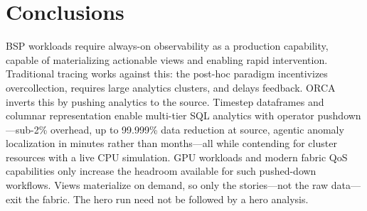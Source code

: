 
\section{Conclusions}






BSP workloads require always-on observability as a production capability, capable of materializing
actionable views and enabling rapid intervention.
Traditional tracing works against this: the post-hoc paradigm incentivizes overcollection, requires
large analytics clusters, and delays feedback.
ORCA inverts this by pushing analytics to the source.
Timestep dataframes and columnar representation enable multi-tier SQL analytics with operator
pushdown---sub-2\% overhead, up to 99.999\% data reduction at source, agentic anomaly localization
in minutes rather than months---all while contending for cluster resources with a live CPU
simulation.
GPU workloads and modern fabric QoS capabilities only increase the headroom available for such
pushed-down workflows.
Views materialize on demand, so only the stories---not the raw data---exit the fabric.
The hero run need not be followed by a hero analysis.

